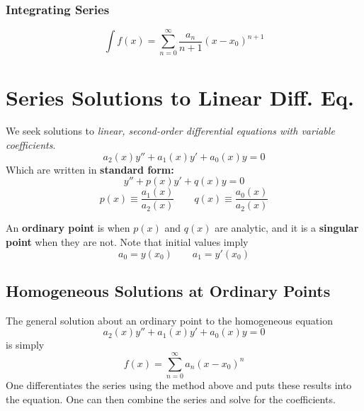 \subsubsection{Integrating Series}
\begin{equation*}
    \int f(x) = \sum_{n=0}^\infty \frac{a_n}{n+1} (x-x_0)^{n+1}
\end{equation*}



\section{Series Solutions to Linear Diff. Eq.}
We seek solutions to \emph{linear, second-order differential equations with variable coefficients}.
\begin{equation*}
    a_2(x) y'' + a_1(x) y'+ a_0(x) y = 0
\end{equation*}
Which are written in \textbf{standard form:}
\begin{equation*}
    y'' + p(x) y'+ q(x) y = 0
\end{equation*}
\begin{equation*}
    p(x) \equiv \frac{a_1(x)}{a_2(x)} \quad \quad  q(x) \equiv \frac{a_0(x)}{a_2(x)}
\end{equation*}

An \textbf{ordinary point} is when $p(x)$ and $q(x)$ are analytic, and it is a \textbf{singular point} when they are not. Note that initial values imply
\begin{equation*}
    a_0 = y(x_0) \quad \quad a_1 = y'(x_0)
\end{equation*}


\subsection{Homogeneous Solutions at Ordinary Points}
The general solution about an ordinary point to the homogeneous equation
\begin{equation} \label{eq:homo-variable}
    a_2(x) y'' + a_1(x) y'+ a_0(x) y = 0
\end{equation}
is simply
\begin{equation} \label{eq:vanilla-series}
    f(x) = \sum_{n=0}^\infty a_n (x-x_0)^n 
\end{equation}
One differentiates the series using the method above and puts these results into the equation. One can then combine the series and solve for the coefficients.


